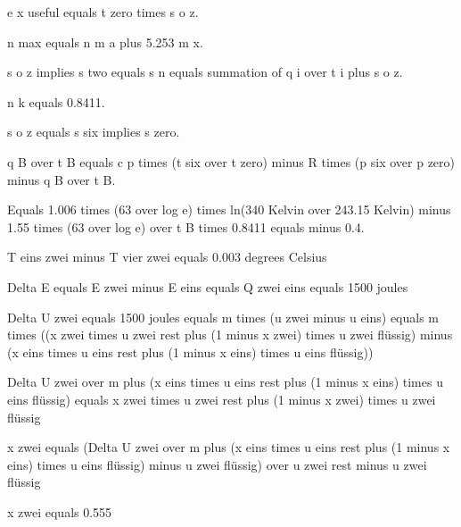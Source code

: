 e x useful equals t zero times s o z.

n max equals n m a plus 5.253 m x.

s o z implies s two equals s n equals summation of q i over t i plus s o z.

n k equals 0.8411.

s o z equals s six implies s zero.

q B over t B equals c p times (t six over t zero) minus R times (p six over p zero) minus q B over t B.

Equals 1.006 times (63 over log e) times ln(340 Kelvin over 243.15 Kelvin) minus 1.55 times (63 over log e) over t B times 0.8411 equals minus 0.4.

T eins zwei minus T vier zwei equals 0.003 degrees Celsius

Delta E equals E zwei minus E eins equals Q zwei eins equals 1500 joules

Delta U zwei equals 1500 joules equals m times (u zwei minus u eins) equals m times ((x zwei times u zwei rest plus (1 minus x zwei) times u zwei flüssig) minus (x eins times u eins rest plus (1 minus x eins) times u eins flüssig))

Delta U zwei over m plus (x eins times u eins rest plus (1 minus x eins) times u eins flüssig) equals x zwei times u zwei rest plus (1 minus x zwei) times u zwei flüssig

x zwei equals (Delta U zwei over m plus (x eins times u eins rest plus (1 minus x eins) times u eins flüssig) minus u zwei flüssig) over u zwei rest minus u zwei flüssig

x zwei equals 0.555
